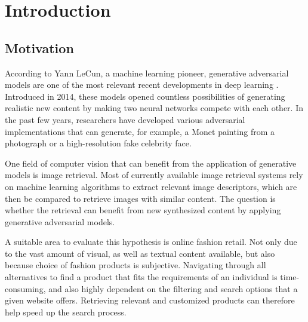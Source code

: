 \documentclass[12pt]{report}
\begin{document}


\pagestyle{plain}
\renewcommand{\baselinestretch}{0.75}\normalsize
\tableofcontents
\renewcommand{\baselinestretch}{1.0}\normalsize
\clearpage


\pagestyle{fancy}
\fancyhf{}
\lhead{\slshape\nouppercase{\rightmark}}
\rhead{ \thepage}
\renewcommand{\headrulewidth}{.5pt}
\chapter{Introduction}

\section{Motivation}
According to Yann LeCun, a machine learning pioneer, generative adversarial models are one of the most relevant recent developments in deep learning \cite{yann_lecun_what_2016}. Introduced in 2014, these models opened countless possibilities of generating realistic new content by making two neural networks compete with each other. In the past few years, researchers have developed various adversarial implementations that can generate, for example, a Monet painting from a photograph or  a high-resolution fake celebrity face.

One field of computer vision that can benefit from the application of generative models is image retrieval. Most of currently available image retrieval systems rely on machine learning algorithms to extract relevant image descriptors, which are then be compared to retrieve images with similar content. The question is whether the retrieval can benefit from new synthesized content by applying generative adversarial models.

A suitable area to evaluate this hypothesis is online fashion retail. Not only due to the vast amount of visual, as well as textual content available, but also because choice of fashion products is subjective. Navigating through all alternatives to find a product that fits the requirements of an individual is time-consuming, and also highly dependent on the filtering and search options that a given website offers. Retrieving relevant and customized products can therefore help speed up the search process.
\end{document}

